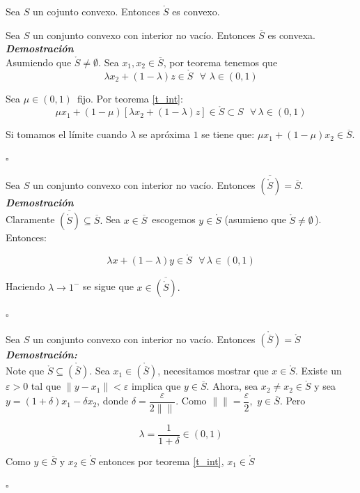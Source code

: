 {\corolario Sea $S$ un cojunto convexo. Entonces $\mathring{S}$ es convexo. \label{int-convx}}

{\corolario Sea $S$ un conjunto convexo con interior no vac\'io. Entonces $\overline{S}$ es convexa. \label{cl-convx}}\\

\textbf{\itshape Demostraci\'on}\\
Asumiendo que $\mathring{S} \neq \emptyset$. Sea $x_1, x_2 \in \overline{S}$, por teorema tenemos que 
$$\lambda x_2 + (1 - \lambda)z \in \mathring{S}\,\,\,\, \forall \,\,\lambda \in (0, 1)$$

Sea $\mu \in (0, 1)\,$ fijo. Por teorema \ref{t_int}:
$$\mu x_1 + (1 - \mu)[\lambda x_2 + (1 - \lambda)z] \in \mathring{S} \subset S \,\,\,\, \forall \, \lambda \in (0, 1)$$

Si tomamos el l\'imite cuando $\lambda $ se apr\'oxima $1$ se tiene que: $\mu x_1 + (1 - \mu)x_2 \in \overline{S}.$
\begin{flushright}
   $\square$
\end{flushright}

{\corolario Sea $S$ un conjunto convexo con interior no vac\'io. Entonces $\overline{(\mathring{S})} = \overline{S}$. \label{cl}}\\

\textbf{\itshape Demostraci\'on}\\
Claramente $\overline{(\mathring{S})} \subseteq \overline{S}.$ Sea $x \in \overline{S}\,$ escogemos $y \in \mathring{S}$ (asumieno que
$\mathring{S} \neq \emptyset\, $). Entonces:

$$\lambda x + (1 - \lambda)y \in \mathring{S}\,\,\,\, \forall \, \lambda \in (0, 1)$$

Haciendo $\lambda \rightarrow 1^{-} $ se sigue que $x \in \overline{(\mathring{S})}.$
\begin{flushright}
   $\square$
\end{flushright}

{\corolario Sea $S$ un conjunto convexo con interior no vac\'io. Entonces $\mathring{(\overline{S})} = \mathring{S}$ \label{int} }\\

\textbf{\itshape Demostraci\'on:}\\
Note que $\mathring{S} \subseteq \mathring{(\overline{S})}. $ Sea $x_1 \in \mathring{(\overline{S})}$, necesitamos mostrar que 
$x \in \mathring{S}$. Existe un $\varepsilon > 0 $ tal que $\parallel y - x_1 \parallel < \varepsilon$ implica que $y \in \overline{S}$.
Ahora, sea $x_2 \neq x_2 \in \mathring{S}$ y sea $y = (1 + \delta)x_1 - \delta x_2$, donde $\delta = 
\dfrac{\varepsilon}{2\parallel \parallel}$. Como $\parallel \parallel = \dfrac{\varepsilon}{2}, \,\, y \in \overline{S}$. Pero

$$\lambda = \dfrac{1}{1 + \delta} \in (0, 1)$$

Como $y \in \overline{S} $ y $x_2 \in \mathring{S} $ entonces por teorema \ref{t_int}, $x_1 \in \mathring{S}$
\begin{flushright}
   $\square$
\end{flushright}









